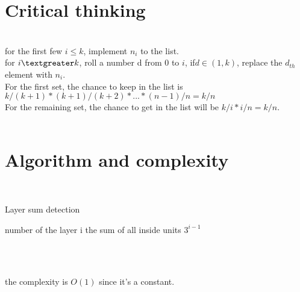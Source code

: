 \documentclass{article}
\begin{document}
\section{Critical thinking}
\\for the first few $i \leq k$, implement $n_i$ to the list.
\\for $i \textgreater k$, roll a number d from $0$ to $i$, if$ d \in (1, k)$, replace the $d_{th}$ element with $n_i$.
\\For the first set, the chance to keep in the list is $k/(k+1)*(k+1)/(k+2)*...*(n-1)/n=k/n$
\\For the remaining set, the chance to get in the list will be $k/i*i/n = k/n$.
\\\\
\section{Algorithm and complexity}
\\
\begin{algorithm}
    \caption{Layer sum detection}
    \begin{algorithmic}[1]
    \Require number of the layer i
    \Ensure the sum of all inside units
    \State \Return $3^{i-1}$
    \end{algorithmic}
\end{algorithm}
\\\\
the complexity is $O (1) $ since it's a constant.
\clearpage
\end{document}
